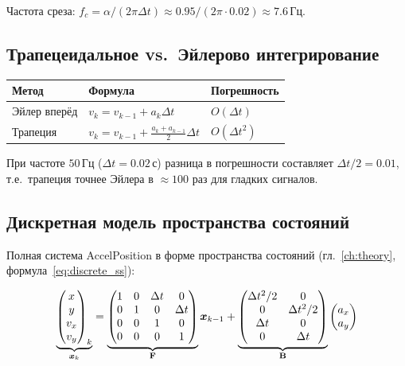 Частота среза: $f_c = \alpha/(2\pi\Delta t) \approx 0.95/(2\pi \cdot 0.02) \approx 7.6\,\text{Гц}$.

\subsection{Трапецеидальное vs.\ Эйлерово интегрирование}

\begin{center}
\begin{tabular}{lll}
\toprule
\textbf{Метод} & \textbf{Формула} & \textbf{Погрешность}\\
\midrule
Эйлер вперёд & $v_k = v_{k-1} + a_k \Delta t$ & $O(\Delta t)$\\
Трапеция & $v_k = v_{k-1} + \frac{a_k + a_{k-1}}{2}\Delta t$ & $O(\Delta t^2)$\\
\bottomrule
\end{tabular}
\end{center}

При частоте $50\,\text{Гц}$ ($\Delta t = 0.02\,\text{с}$) разница в погрешности
составляет $\Delta t/2 = 0.01$, т.е.\ трапеция точнее Эйлера в ${\approx}100$ раз
для гладких сигналов.

\subsection{Дискретная модель пространства состояний}

Полная система AccelPosition в форме пространства состояний
(гл.~\ref{ch:theory}, формула~\eqref{eq:discrete_ss}):

\begin{equation}
  \underbrace{\begin{pmatrix} x \\ y \\ v_x \\ v_y \end{pmatrix}_{k}}_{\bm{x}_k}
  = \underbrace{\begin{pmatrix}
    1 & 0 & \Delta t & 0 \\
    0 & 1 & 0 & \Delta t \\
    0 & 0 & 1 & 0 \\
    0 & 0 & 0 & 1
  \end{pmatrix}}_{\mathbf{F}}
  \bm{x}_{k-1}
  + \underbrace{\begin{pmatrix}
    \Delta t^2/2 & 0 \\
    0 & \Delta t^2/2 \\
    \Delta t & 0 \\
    0 & \Delta t
  \end{pmatrix}}_{\mathbf{B}}
  \begin{pmatrix} a_x \\ a_y \end{pmatrix}
  \label{eq:accel_ss}
\end{equation}

